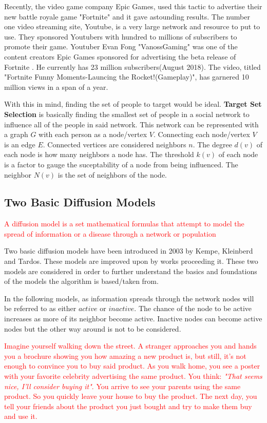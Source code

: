 Recently, the video game company Epic Games, used this tactic to advertise their new battle royale game "Fortnite" and it gave astounding results. The number one video streaming site, Youtube, is a very large network and resource to put to use. They sponsored Youtubers with hundred to millions of subscribers to promote their game.\cite{sponsoredvideos} Youtuber Evan Fong "VanossGaming" was one of the content creators Epic Games sponsored for advertising the beta release of Fortnite \cite{vanoss}. He currently has 23 million subscribers(August 2018). The video, titled "Fortnite Funny Moments-Launcing the Rocket!(Gameplay)", has garnered 10 million views in a span of a year.

With this in mind, finding the set of people to target would be ideal. \textbf{Target Set Selection} is basically finding the smallest set of people in a social network to influence all of the people in said network.\cite{Kempe,chen,Shakarian:2012:LSN:2456719.2457081} This network can be represented with a graph $G$ with each person as a node/vertex $V$. Connecting each node/vertex $V$ is an edge $E$. Connected vertices are considered neighbors $n$. The degree $d(v)$ of each node is how many neighbors a node has. The threshold $k(v)$ of each node is a factor to gauge the suceptability of a node from being influenced. The neighbor $N(v)$ is the set of neighbors of the node. 

\subsection{Two Basic Diffusion Models}
\textcolor{red}{A diffusion model is a set mathematical formulas that attempt to model the spread of information or a disease through a network or population}

Two basic diffusion models have been introduced in 2003 by Kempe, Kleinberd and Tardos.\cite{Kempe} These models are improved upon by works proceeding it. These two models are considered in order to further understand the basics and foundations of the models the algorithm is based/taken from.


In the following models, as information spreads through the network nodes will be referred to as either $active$ or $inactive$. The chance of the node to be active increases as more of its neighbor become active. Inactive nodes can become active nodes but the other way around is not to be considered. 

\textcolor{red}{
Imagine yourself walking down the street. A stranger approaches you and hands you a brochure showing you how amazing a new product is, but still, it's not enough to convince you to buy said product. As you walk home, you see a poster with your favorite celebrity advertising the same product. You think: \textit{"That seems nice, I'll consider buying it"}. You arrive to see your parents using the same product. So you quickly leave your house to buy the product. The next day, you tell your friends about the product you just bought and try to make them buy and use it.}

